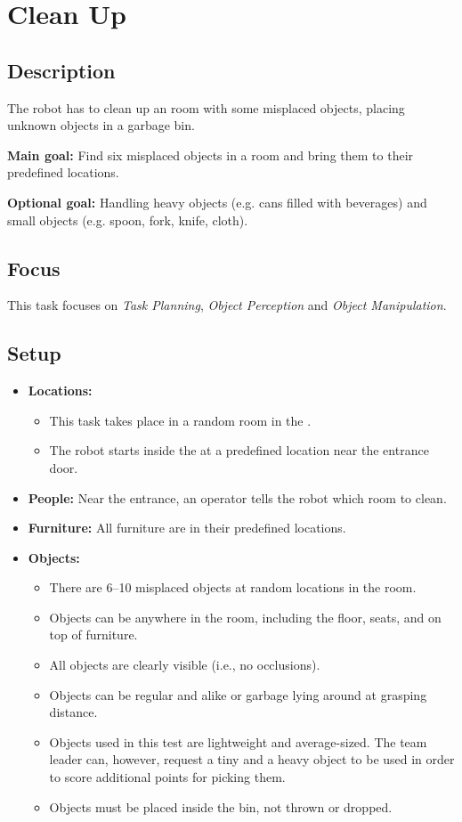 \section{Clean Up}
\label{test:clean-up}

\subsection*{Description}
	The robot has to clean up an \Arena{} room with some misplaced objects, placing unknown objects in a garbage bin.

\textbf{Main goal:}
	Find six misplaced objects in a room and bring them to their predefined locations.

\textbf{Optional goal:}
	Handling heavy objects (e.g. cans filled with beverages) and small objects (e.g. spoon, fork, knife, cloth).

\subsection*{Focus}
	This task focuses on 
	\textit{Task Planning},
	\textit{Object Perception} and
	\textit{Object Manipulation}.

\subsection*{Setup}
\begin{itemize}[nosep]	
	\item \textbf{Locations:} 
		\begin{itemize}
			\item This task takes place in a random room in the \Arena{}.
			\item The robot starts inside the \Arena{} at a predefined location near the entrance door.
		\end{itemize}
	\item \textbf{People:} Near the entrance, an operator tells the robot which room to clean.
	\item \textbf{Furniture:} All furniture are in their predefined locations.
	\item \textbf{Objects:} 
		\begin{itemize}
			\item There are 6--10 misplaced objects at random locations in the room.
			\item Objects can be anywhere in the room, including the floor, seats, and on top of furniture.
			\item All objects are clearly visible (i.e., no occlusions).
			\item Objects can be regular and alike or garbage lying around at grasping distance.
			\item Objects used in this test are lightweight and average-sized. The team leader can, however, request a tiny and a heavy object to be used in order to score additional points for picking them.
			\item Objects must be placed inside the bin, not thrown or dropped.
		\end{itemize}
\end{itemize}

